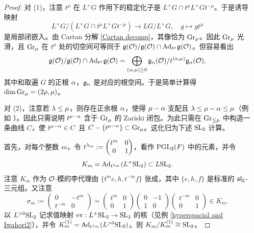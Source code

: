 \begin{proof}
对 (1)，注意 $t^\mu$ 在 $L^+G$ 作用下的稳定化子是 $L^+G\cap t^\mu L^+G t^{-\mu}$。于是诱导映射
\[L^+G/(L^+G\cap t^\mu L^+G t^{-\mu}) \to LG/L^+G,\quad g \mapsto gt^\mu\]
是局部闭嵌入。由 Cartan 分解 \eqref{Cartan decomp}，其像恰为 ${\operatorname{Gr}}_\mu$。因此 ${\operatorname{Gr}}_\mu$ 光滑，且 ${\operatorname{Gr}}_\mu$ 在 $t^\mu$ 处的切空间可等同于 ${\mathfrak g}({\mathcal O})/{\mathfrak g}({\mathcal O})\cap {\operatorname{Ad}}_{t^\mu}{\mathfrak g}({\mathcal O})$。但容易看出
\[{\mathfrak g}({\mathcal O})/{\mathfrak g}({\mathcal O})\cap {\operatorname{Ad}}_{t^\mu}{\mathfrak g}({\mathcal O})=\bigoplus_{({\alpha},\mu)\geq 0} {\mathfrak g}_{\alpha}({\mathcal O})/t^{({\alpha},\mu)}{\mathfrak g}_{\alpha}({\mathcal O}),\]
其中和取遍 $G$ 的正根 ${\alpha}$，${\mathfrak g}_{\alpha}$ 是对应的根空间。于是简单计算得 $\dim {\operatorname{Gr}}_\mu=(2\rho,\mu)$。

对 (2)，注意若 ${\lambda}\leq \mu$，则存在正余根 ${\alpha}$，使得 $\mu-{\alpha}$ 支配且 ${\lambda}\leq \mu-{\alpha}\leq \mu$（例如 \cite[Lemma 2.3]{R3}）。因此只需说明 $t^{\mu-{\alpha}}$ 含于 ${\operatorname{Gr}}_\mu$ 的 Zariski 闭包。为此只需在 ${\operatorname{Gr}}_{\leq\mu}$ 中构造一条曲线 $C$，使 $t^{\mu-{\alpha}}\in C$ 且 $C-\{t^{\mu-{\alpha}}\}\subset {\operatorname{Gr}}_\mu$。这化归为下述 ${\operatorname{SL}}_2$ 计算。

首先，对每个整数 $m$，令 $t^{{\lambda}_m}:=\begin{pmatrix} t^m & 0\\ 0 &1\end{pmatrix}$，看作 $\operatorname{PGL}_2(F)$ 中的元素，并令
\[K_m={\operatorname{Ad}}_{t^{{\lambda}_m}}(L^+{\operatorname{SL}}_2)\subset L{\operatorname{SL}}_2.\]
注意 $K_m$ 作为 ${\mathcal O}$-模的李代理由 $\{t^me, h, t^{-m}f\}$ 张成，其中 $\{e,h,f\}$ 是标准的 ${\mathfrak s}{\mathfrak l}_2$-三元组。又注意
\[\sigma_m:=\begin{pmatrix}0&-t^m\\t^{-m}&0\end{pmatrix}=\begin{pmatrix} t^m & 0\\ 0 &1\end{pmatrix}\begin{pmatrix}0&-1\\1&0\end{pmatrix}\begin{pmatrix} t^{-m} & 0\\ 0 &1\end{pmatrix}\in K_m.\]
以 $L^{>0}{\operatorname{SL}}_2$ 记求值映射 $\operatorname{ev}:L^+{\operatorname{SL}}_2\to {\operatorname{SL}}_2$ 的核（见例 \ref{hyperspacial and Iwahori2}），并令 $K_m^{(1)}={\operatorname{Ad}}_{t^{{\lambda}_m}}(L^{>0}{\operatorname{SL}}_2)$。则 $K_m/K_m^{(1)}\cong {\operatorname{SL}}_2$。


\end{proof}

